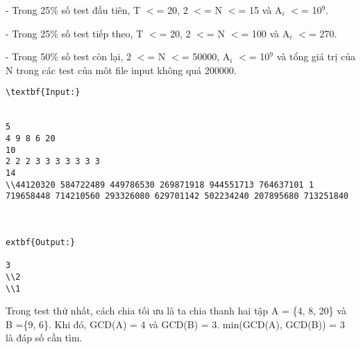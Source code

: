 - Trong 25\% số test đầu tiên, T $<$= 20, 2 $<$= N $<$= 15 và A$_i$ $<$= 10$^9$.

- Trong 25\% số test tiếp theo, T $<$= 20, 2 $<$= N $<$= 100 và A$_i$ $<$= 270.

- Trong 50\% số test còn lại, 2 $<$= N $<$= 50000, A$_i$ $<$= 10$^9$ và tổng giá trị của N trong các test của môt file input không quá 200000.
\begin{verbatim}
\textbf{Input:}


5 
4 9 8 6 20 
10 
2 2 2 3 3 3 3 3 3 3 
14 
\\44120320 584722489 449786530 269871918 944551713 764637101 1 719658448 714210560 293326080 629701142 502234240 207895680 713251840



extbf{Output:}

3
\\2
\\1 \end{verbatim}
Trong test thứ nhất, cách chia tối ưu là ta chia thanh hai tập A = \{4, 8, 20\} và B =\{9, 6\}. Khi đó, GCD(A) = 4 và GCD(B) = 3. min(GCD(A), GCD(B)) = 3 là đáp số cần tìm.